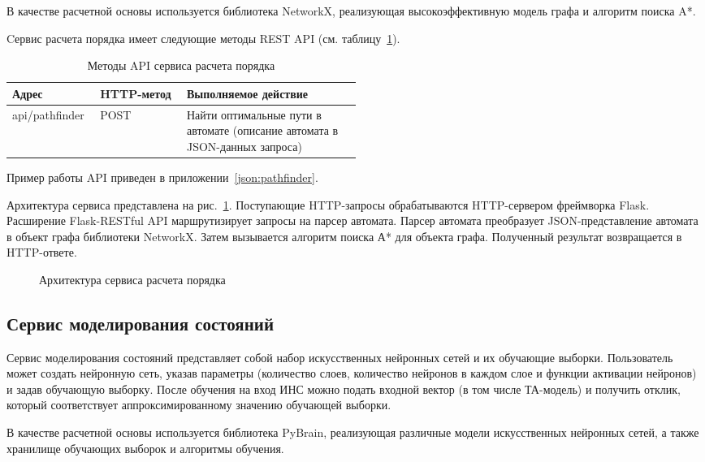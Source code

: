 В качестве расчетной основы используется библиотека NetworkX, реализующая высокоэффективную модель графа и алгоритм поиска A*.

Cервис расчета порядка имеет следующие методы REST API (см. таблицу~\ref{tab:pathfinder}).
\begin{table} [htbp]
  \centering
  \parbox{15cm}{\caption{Методы API сервиса расчета порядка}\label{tab:pathfinder}}
  \begin{center}
  \begin{tabular}{| l | l | p{0.5\linewidth} |}
  \hline
  Адрес & HTTP-метод & Выполняемое действие\\
  \hline
  api/pathfinder & POST & Найти оптимальные пути в автомате (описание автомата в JSON-данных запроса)\\
  \hline
  \end{tabular}
  \end{center}
\end{table}

Пример работы API приведен в приложении~\ref{json:pathfinder}.

Архитектура сервиса представлена на рис.~\ref{pic:pathfinder-arch}.
Поступающие HTTP-запросы обрабатываются HTTP-сервером фреймворка Flask.
Расширение Flask-RESTful API маршрутизирует запросы на парсер автомата.
Парсер автомата преобразует JSON-представление автомата в объект графа библиотеки NetworkX.
Затем вызывается алгоритм поиска А* для объекта графа.
Полученный результат возвращается в HTTP-ответе.

\begin{figure}[ht]
\caption{Архитектура сервиса расчета порядка}
\label{pic:pathfinder-arch}
\end{figure}

\subsection{Сервис моделирования состояний}
Сервис моделирования состояний представляет собой набор искусственных нейронных сетей и их обучающие выборки.
Пользователь может создать нейронную сеть, указав параметры (количество слоев, количество нейронов в каждом слое и функции активации нейронов) и задав обучающую выборку.
После обучения на вход ИНС можно подать входной вектор (в том числе ТА-модель) и получить отклик, который соответствует аппроксимированному значению обучающей выборки.

В качестве расчетной основы используется библиотека PyBrain, реализующая различные модели искусственных нейронных сетей, а также хранилище обучающих выборок и алгоритмы обучения.

